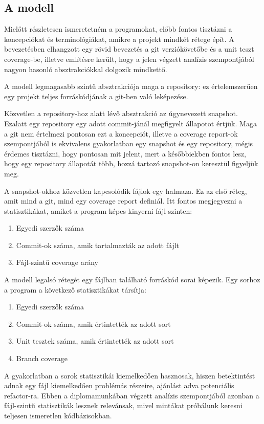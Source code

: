 \subsection{A modell}

Mielőtt részletesen ismeretetném a programokat, előbb fontos tisztázni a koncepciókat és terminológiákat, amikre a projekt mindkét rétege épít. A bevezetésben elhangzott egy rövid bevezetés a git verziókövetőbe és a unit teszt coverage-be, illetve említésre került, hogy a jelen végzett analízis szempontjából nagyon hasonló absztrakciókkal dolgozik mindkettő.

A modell legmagasabb szintű absztrakciója maga a repository: ez értelemszerűen egy projekt teljes forráskódjának a git-ben való leképezése.

Közvetlen a repository-hoz alatt lévő absztrakció az úgynevezett snapshot. Ezalatt egy repository egy adott commit-jánál megfigyelt állapotot értjük. Maga a git nem értelmezi pontosan ezt a koncepciót, illetve a coverage report-ok szempontjából is ekvivalens gyakorlatban egy snapshot és egy repository, mégis érdemes tisztázni, hogy pontosan mit jelent, mert a későbbiekben fontos lesz, hogy egy repository állapotát több, hozzá tartozó snapshot-on keresztül figyeljük meg.

A snapshot-okhoz közvetlen kapcsolódik fájlok egy halmaza. Ez az első réteg, amit mind a git, mind egy coverage report definiál. Itt fontos megjegyezni a statisztikákat, amiket a program képes kinyerni fájl-szinten:
\begin{enumerate}
    \item Egyedi szerzők száma
    \item Commit-ok száma, amik tartalmazták az adott fájlt
    \item Fájl-szintű coverage arány
\end{enumerate}

A modell legalsó rétegét egy fájlban található forráskód sorai képezik. Egy sorhoz a program a következő statisztikákat társítja:
\begin{enumerate}
    \item Egyedi szerzők száma
    \item Commit-ok száma, amik értintették az adott sort
    \item Unit tesztek száma, amik értintették az adott sort
    \item Branch coverage
\end{enumerate}

A gyakorlatban a sorok statisztikái kiemelkedően hasznosak, hiszen betektintést adnak egy fájl kiemelkedően problémás részeire, ajánlást adva potenciális refactor-ra. Ebben a diplomamunkában végzett analízis szempontjából azonban a fájl-szintű statisztikák lesznek relevánsak, mivel mintákat próbálunk keresni teljesen ismeretlen kódbázisokban.

